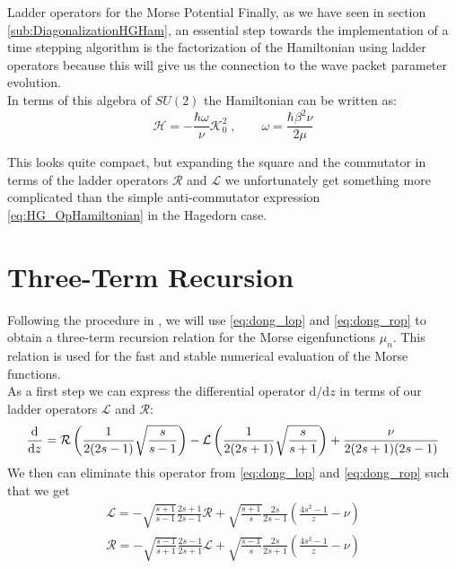 \begin{chapter}{Ladder operators for the Morse Potential}
Finally, as we have seen in section \ref{sub:DiagonalizationHGHam}, an essential step towards the implementation of a time stepping algorithm is the 
factorization of the Hamiltonian using ladder operators because this will give us the connection to the wave packet parameter evolution.\\

In terms of this algebra of $SU(2)$ the Hamiltonian can be written as:
\begin{equation}
    \label{eq:DongHamiltonian}
    \mathcal{H}=-\frac{\hbar \omega}{\nu}\mathcal{K}_0^2\;,\qquad \omega=\frac{\hbar\beta^2\nu}{2\mu}
\end{equation}

This looks quite compact, but expanding the square and the commutator in terms of the ladder operators $\mathcal{R}$ and $\mathcal{L}$ 
we unfortunately get something more complicated than the simple anti-commutator expression \eqref{eq:HG_OpHamiltonian} in the Hagedorn case.


\section{Three-Term Recursion} %
\label{sec:ThreeTermRecursion}
Following the procedure in \cite{FGL_semiclassical_dynamics}, we will use \eqref{eq:dong_lop} and \eqref{eq:dong_rop} to obtain a three-term recursion
relation for the Morse eigenfunctions $\mu_n$. This relation is used for the fast and stable numerical evaluation of the Morse functions.\\

As a first step we can express the differential operator $\mathrm{d}/\mathrm{d}z$ in terms of our ladder operators $\mathcal{L}$ and $\mathcal{R}$:
\begin{equation}
    \label{eq:dong_ddyinLR}
    \frac{\mathrm{d}^{}}{\mathrm{d}z^{}}=\mathcal{R}\left(\frac{1}{2(2s-1)}\sqrt{\frac{s}{s-1}}\right)-\mathcal{L}\left(\frac{1}{2(2s+1)}\sqrt{\frac{s}{s+1}}\right)
    +\frac{\nu}{2(2s+1)(2s-1)}
\end{equation}
We then can eliminate this operator from \eqref{eq:dong_lop} and \eqref{eq:dong_rop} such that we get
\begin{align}
    \mathcal{L}=-\sqrt{\frac{s+1}{s-1}}\frac{2s+1}{2s-1}\mathcal{R}
    +\sqrt{\frac{s+1}{s}}\frac{2s}{2s-1}\left(\frac{4s^2-1}{z}-\nu\right)\label{eq:dong_lop2}\\
    \mathcal{R}=-\sqrt{\frac{s-1}{s+1}}\frac{2s-1}{2s+1}\mathcal{L}
    +\sqrt{\frac{s-1}{s}}\frac{2s}{2s+1}\left(\frac{4s^2-1}{z}-\nu\right)\label{eq:dong_rop2}
\end{align}


\end{chapter}
